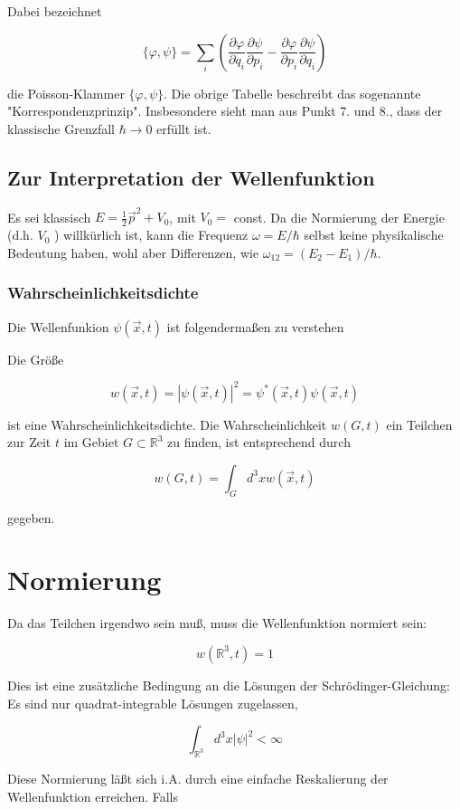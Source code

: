 \documentclass[10pt, letterpaper]{article}
\begin{document}
Dabei bezeichnet

$$
\{\varphi, \psi\}=\sum_{i}\left(\frac{\partial \varphi}{\partial q_{i}} \frac{\partial \psi}{\partial p_{i}}-\frac{\partial \varphi}{\partial p_{i}} \frac{\partial \psi}{\partial q_{i}}\right)
$$

die Poisson-Klammer $\{\varphi, \psi\}$. Die obrige Tabelle beschreibt das sogenannte "Korrespondenzprinzip". Insbesondere sieht man aus Punkt 7. und 8., dass der klassische Grenzfall $\hbar \rightarrow 0$ erfüllt ist.

\subsection*{Zur Interpretation der Wellenfunktion}
Es sei klassisch $E=\frac{1}{2} \vec{p}^{2}+V_{0}$, mit $V_{0}=$ const. Da die Normierung der Energie (d.h. $V_{0}$ ) willkürlich ist, kann die Frequenz $\omega=E / \hbar$ selbst keine physikalische Bedeutung haben, wohl aber Differenzen, wie $\omega_{12}=\left(E_{2}-E_{1}\right) / \hbar$.

\subsubsection*{Wahrscheinlichkeitsdichte}
Die Wellenfunkion $\psi(\vec{x}, t)$ ist folgendermaßen zu verstehen

Die Größe

$$
w(\vec{x}, t)=|\psi(\vec{x}, t)|^{2}=\psi^{*}(\vec{x}, t) \psi(\vec{x}, t)
$$

ist eine Wahrscheinlichkeitsdichte. Die Wahrscheinlichkeit $w(G, t)$ ein Teilchen zur Zeit $t$ im Gebiet $G \subset \mathbb{R}^{3}$ zu finden, ist entsprechend durch

$$
w(G, t)=\int_{G} d^{3} x w(\vec{x}, t)
$$

gegeben.

\section*{Normierung}
Da das Teilchen irgendwo sein muß, muss die Wellenfunktion normiert sein:

$$
w\left(\mathbb{R}^{3}, t\right)=1
$$

Dies ist eine zusätzliche Bedingung an die Lösungen der Schrödinger-Gleichung: Es sind nur quadrat-integrable Lösungen zugelassen,

$$
\int_{\mathbb{R}^{3}} d^{3} x|\psi|^{2}<\infty
$$

Diese Normierung läßt sich i.A. durch eine einfache Reskalierung der Wellenfunktion erreichen. Falls
\end{document}
